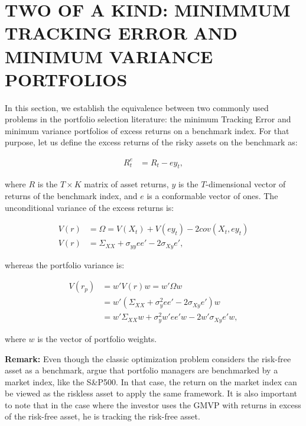 \documentclass[12pt,oneside,a4paper]{memoir}
\begin{document}
\section{TWO OF A KIND: MINIMMUM TRACKING ERROR AND MINIMUM VARIANCE PORTFOLIOS}\label{section:theory}

In this section, we establish the equivalence between two commonly used problems in the portfolio selection literature: the minimum Tracking Error and minimum variance portfolios of excess returns on a benchmark index. For that purpose, let us define the excess returns of the risky assets on the benchmark as:

\begin{align*}
R^{e}_{t} &= R_{t} - e y_{t},
\end{align*}

\noindent
where $R$ is the $T \times K$ matrix of asset returns, $y$ is the $T$-dimensional vector of returns of the benchmark index, and $e$ is a conformable vector of ones. The unconditional variance of the excess returns is:

\begin{align*}
V(r) &= \Omega = V(X_{t}) + V(e y_{t}) - 2cov(X_{t}, e y_{t})
\\
V(r) &= \Sigma_{XX} + \sigma_{yy} ee' - 2 \sigma_{Xy} e',
\end{align*}

\noindent
whereas the portfolio variance is:

\begin{align*}
V(r_{p}) &= w'V(r)w = w'\Omega w
\\
&= w'(\Sigma_{XX} + \sigma^{2}_{y}ee' - 2\sigma_{Xy}e')w
\\
&= w'\Sigma_{XX}w + \sigma^{2}_{y}w'ee'w - 2w'\sigma_{Xy}e'w,
\end{align*}

\noindent
where $w$ is the vector of portfolio weights. 

\textbf{Remark:}
Even though the classic optimization problem considers the risk-free asset as a benchmark,  argue that portfolio managers are benchmarked by a market index, like the S\&P500.
In that case, the return on the market index can be viewed as the riskless asset to apply the same framework.
It is also important to note that in the case where the investor uses the GMVP with returns in excess of the risk-free asset, he is tracking the risk-free asset.
\end{document}
